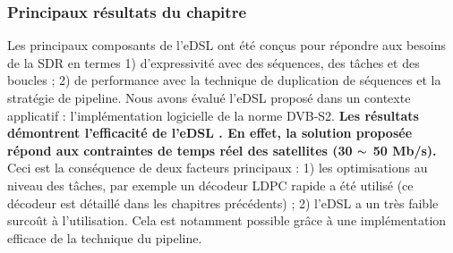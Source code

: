 \subsubsection*{Principaux résultats du chapitre}

Les principaux composants de l'eDSL ont été conçus pour répondre aux besoins de
la SDR en termes 1) d'expressivité avec des séquences, des tâches et des
boucles ; 2) de performance avec la technique de duplication de séquences et la
stratégie de pipeline. Nous avons évalué l'eDSL proposé dans un contexte
applicatif : l'implémentation logicielle de la norme DVB-S2. \textbf{Les
résultats démontrent l'efficacité de l'eDSL \AFFECT. En effet, la solution
proposée répond aux contraintes de temps réel des satellites (30 $\thicksim$
50 Mb/s).} Ceci est la conséquence de deux facteurs principaux : 1) les
optimisations au niveau des tâches, par exemple un décodeur LDPC rapide a été
utilisé (ce décodeur est détaillé dans les chapitres précédents) ; 2) l'eDSL a
un très faible surcoût à l'utilisation. Cela est notamment possible grâce à une
implémentation efficace de la technique du pipeline.
